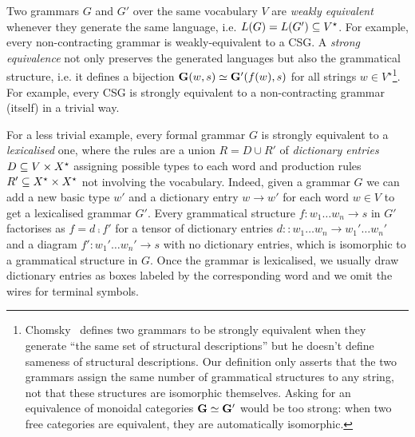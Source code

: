 Two grammars $G$ and $G'$ over the same vocabulary $V$ are \emph{weakly equivalent} whenever they generate the same language, i.e. $L(G) = L(G') \subseteq V^\star$.
For example, every non-contracting grammar is weakly-equivalent to a CSG.
A \emph{strong equivalence} not only preserves the generated languages but also the grammatical structure, i.e. it defines a bijection $\mathbf{G}(w, s) \simeq \mathbf{G}'(f(w), s)$ for all strings $w \in V^\star$\footnote
{Chomsky~\cite{Chomsky63} defines two grammars to be strongly equivalent when they generate ``the same set of structural descriptions'' but he doesn't define sameness of structural descriptions.
Our definition only asserts that the two grammars assign the same number of grammatical structures to any string, not that these structures are isomorphic themselves.
Asking for an equivalence of monoidal categories $\mathbf{G} \simeq \mathbf{G}'$ would be too strong: when two free categories are equivalent, they are automatically isomorphic.}.
For example, every CSG is strongly equivalent to a non-contracting grammar (itself) in a trivial way.

For a less trivial example, every formal grammar $G$ is strongly equivalent to a \emph{lexicalised} one, where the rules are a union $R = D \cup R'$ of \emph{dictionary entries} $D \subseteq V \times X^\star$ assigning possible types to each word and production rules $R' \subseteq X^\star \times X^\star$ not involving the vocabulary.
Indeed, given a grammar $G$ we can add a new basic type $w'$ and a dictionary entry $w \to w'$ for each word $w \in V$ to get a lexicalised grammar $G'$.
Every grammatical structure $f : w_1 \dots w_n \to s$ in $G'$ factorises as $f = d \fcmp f'$ for a tensor of dictionary entries $d : : w_1 \dots w_n \to w_1' \dots w_n'$ and a diagram $f' : w_1' \dots w_n' \to s$ with no dictionary entries, which is isomorphic to a grammatical structure in $G$.
Once the grammar is lexicalised, we usually draw dictionary entries as boxes labeled by the corresponding word and we omit the wires for terminal symbols.


